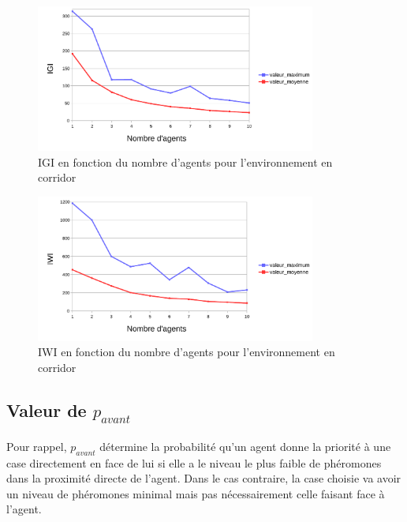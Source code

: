 \documentclass{article}
\begin{document}
            \begin{figure}[!h]
                \begin{center}
                    \includegraphics[width = 0.82\textwidth]{graphes pdf/variance tortues IGI corridor.pdf}
                    \caption{IGI en fonction du nombre d'agents pour l'environnement en corridor}
                \end{center}
            \end{figure}
            \begin{figure}[!h]
                \begin{center}
                    \includegraphics[width = 0.82\textwidth]{graphes pdf/variance tortues IWI corridor.pdf}
                    \caption{IWI en fonction du nombre d'agents pour l'environnement en corridor}
                \end{center}
            \end{figure}
            \newpage
    \subsection{Valeur de \texorpdfstring{$p_{avant}$}{p\_avant}}
    \paragraph{}Pour rappel, $p_{avant}$ détermine la probabilité qu'un agent donne la priorité à une case directement en face de lui si elle a le niveau le plus faible de phéromones dans la proximité directe de l'agent.
    Dans le cas contraire, la case choisie va avoir un niveau de phéromones minimal mais pas nécessairement celle faisant face à l'agent. 
\end{document}
